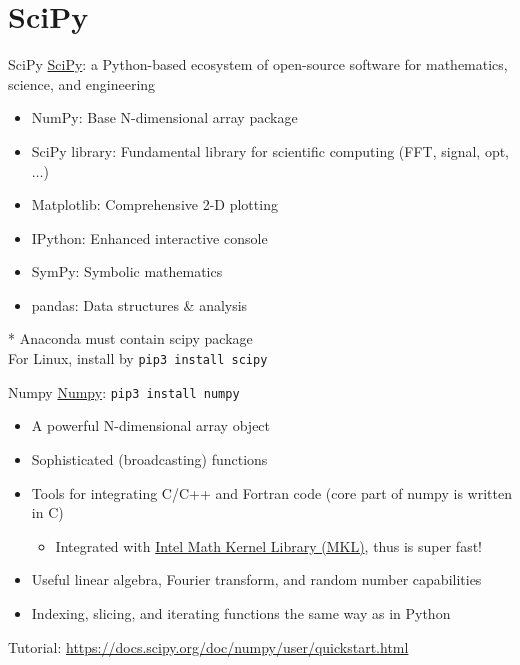 \documentclass{../TexTemplate/myslide}
\begin{document}
\section{SciPy}
\begin{frame}
\sectionpage
\end{frame}

\begin{frame}[fragile]{SciPy}
\href{https://www.scipy.org/}{SciPy}: a Python-based ecosystem of open-source software for mathematics, science, and engineering
\begin{itemize}
	\item NumPy: Base N-dimensional array package
	\item SciPy library: Fundamental library for scientific computing (FFT, signal, opt, $\ldots$)
	\item Matplotlib: Comprehensive 2-D plotting
	\item IPython: Enhanced interactive console
	\item SymPy: Symbolic mathematics
	\item pandas: Data structures \& analysis
\end{itemize}
* Anaconda must contain scipy package\\
For Linux, install by \verb'pip3 install scipy'
\end{frame}

\begin{frame}[fragile]{Numpy}
\href{https://numpy.org/}{Numpy}: \verb'pip3 install numpy' 
\begin{itemize}
	\item A powerful N-dimensional array object
	\item Sophisticated (broadcasting) functions
	\item Tools for integrating C/C++ and Fortran code (core part of numpy is written in C)
	\begin{itemize}
		\item Integrated with \href{https://software.intel.com/en-us/mkl}{Intel Math Kernel Library (MKL)}, thus is super fast!
	\end{itemize}
	\item Useful linear algebra, Fourier transform, and random number capabilities
	\item Indexing, slicing, and iterating functions the same way as in Python
\end{itemize}
Tutorial: \url{https://docs.scipy.org/doc/numpy/user/quickstart.html}
\end{frame}
\end{document}
